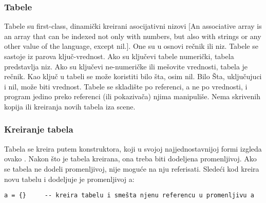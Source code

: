 \documentclass[a4paper]{article}
\begin{document}
\subsubsection{Tabele}
Tabele su first-class, dinamički kreirani asocijativni nizovi [An associative array is an array that can be indexed not only with numbers, but also with strings or any other value of the language, except nil.]. One su u osnovi rečnik ili niz. Tabele se sastoje iz parova ključ-vrednost. Ako su ključevi tabele numerički, tabela predstavlja niz. Ako su ključevi ne-numeričke ili mešovite vrednosti, tabela je rečnik. Kao ključ u tabeli se može koristiti bilo šta, osim nil. Bilo Šta, uključujuci i nil, može biti vrednost.
Tabele se skladište po referenci, a ne po vrednosti, i program jedino preko referenci (ili pokazivača) njima manipuliše. Nema skrivenih kopija ili kreiranja novih tabela iza scene.

\subsubsection{Kreiranje tabela}
Tabela se kreira putem konstruktora, koji u svojoj najjednostavnijoj formi izgleda ovako {}. Nakon što je tabela kreirana, ona treba biti dodeljena promenljivoj. Ako se tabela ne dodeli promenljivoj, nije moguće na nju referisati. Sledeći kod kreira novu tabelu i dodeljuje je promenljivoj a:
\begin{verbatim}
a = {}     -- kreira tabelu i smešta njenu referencu u promenljivu a
\end{verbatim}
\end{document}
